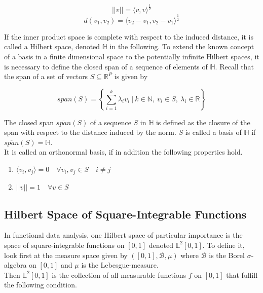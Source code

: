 \documentclass[11pt,twoside,a4paper]{article}
\begin{document}
	\begin{equation}
		\lvert \lvert v \rvert \rvert = {\langle v, v \rangle}^{\frac{1}{2}}
	\end{equation}
	\begin{equation}
	d(v_1, v_2) = {\langle v_2 - v_1, v_2 - v_1 \rangle}^{\frac{1}{2}}
	\end{equation}
	
	If the inner product space is complete with respect to the induced distance, it is called a Hilbert space, denoted $\mathbb{H}$ in the following. To extend the known concept of a basis in a finite dimensional space to the potentially infinite Hilbert spaces, it is necessary to define the closed span of a sequence of elements of $\mathbb{H}$. Recall that the span of a set of vectors $S \subseteq \mathbb{R}^P$ is given by
	
	\begin{equation}
		span(S) = \left\{\sum_{i = 1}^{k} \lambda_i v_i \: \bigg\vert \: k \in \mathbb{N}, \: v_i \in S, \: \lambda_i \in \mathbb{R} \right\}
	\end{equation}
			
	The closed span $\overline{span}(S)$ of a sequence $S$ in $\mathbb{H}$ is defined as the closure of the span with respect to the distance induced by the norm. $S$ is called a basis of $\mathbb{H}$ if $\overline{span}(S) = \mathbb{H}$. \\
	It is called an orthonormal basis, if in addition the following properties hold. 
	\begin{multicols}{2}
		\begin{enumerate}
			\item $\langle v_i, v_j \rangle = 0 \quad \forall v_i, v_j \in S \quad i \neq j$
			\item $\lvert \lvert v \rvert \rvert = 1 \quad \forall v \in S$
		\end{enumerate}
	\end{multicols}

	\subsection{Hilbert Space of Square-Integrable Functions}
	In functional data analysis, one Hilbert space of particular importance is the space of square-integrable functions on $[0,1]$ denoted $\mathbb{L}^2[0,1]$. To define it, look first at the measure space given by $([0,1], \mathcal{B}, \mu)$ where $\mathcal{B}$ is the Borel $\sigma$-algebra on $[0,1]$ and $\mu$ is the Lebesgue-measure.\\
	Then $\mathbb{L}^2[0,1]$ is the collection of all measurable functions $f$ on $[0,1]$ that fulfill the following condition.
	
\end{document}
